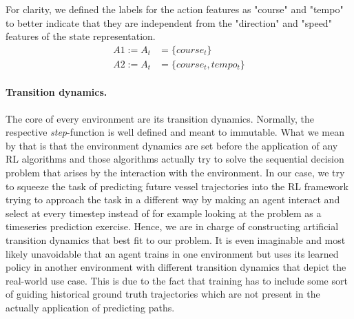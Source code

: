 For clarity, we defined the labels for the action features as "course" and "tempo" to better indicate that they are independent from the "direction" and "speed" features of the state representation.
\begin{equation}
\begin{aligned}
    A1 := A_t &= \{course_t\}
\\
    A2 := A_t &= \{course_t, tempo_t\}
    \end{aligned}
\end{equation}

\paragraph{Transition dynamics.} The core of every environment are its transition dynamics. Normally, the respective \textit{step}-function is well defined and meant to immutable. What we mean by that is that the environment dynamics are set before the application of any RL algorithms and those algorithms actually try to solve the sequential decision problem that arises by the interaction with the environment. In our case, we try to squeeze the task of predicting future vessel trajectories into the RL framework trying to approach the task in a different way by making an agent interact and select at every timestep instead of for example looking at the problem as a timeseries prediction exercise. Hence, we are in charge of constructing artificial transition dynamics that best fit to our problem. It is even imaginable and most likely unavoidable that an agent trains in one environment but uses its learned policy in another environment with different transition dynamics that depict the real-world use case. This is due to the fact that training has to include some sort of guiding historical ground truth trajectories which are not present in the actually application of predicting paths.
\par

